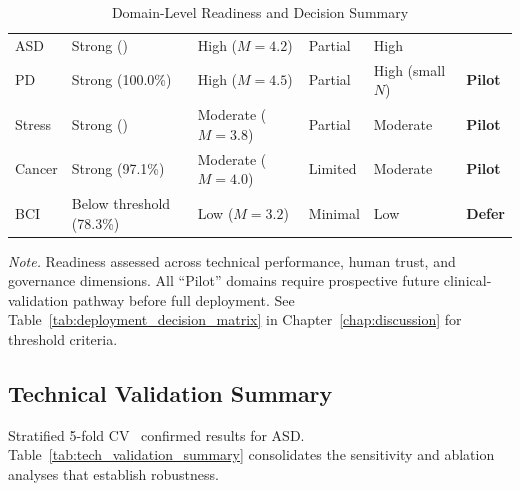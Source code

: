 {\tablestripes\tablefontsize
\begin{xltabular}{\textwidth}{@{} >{\raggedright\arraybackslash}p{1.0cm} L L L L l @{}}
\caption[Domain-Level Readiness and Decision Summary]{Domain-Level Readiness and Decision Summary}\label{tab:domain_readiness} \\
\toprule
{} &  &  &  &  &  \\
\midrule
\endfirsthead
\endhead
\bottomrule
\endlastfoot
ASD & Strong (\asdacc{}) & High ($M = 4.2$) & Partial & High &  \\
PD & Strong (100.0\%) & High ($M = 4.5$) & Partial & High (small $N$) & \textbf{Pilot} \\
Stress & Strong (\stressacc{}) & Moderate ($M = 3.8$) & Partial & Moderate & \textbf{Pilot} \\
Cancer & Strong (97.1\%) & Moderate ($M = 4.0$) & Limited & Moderate & \textbf{Pilot} \\
BCI & Below threshold (78.3\%) & Low ($M = 3.2$) & Minimal & Low & \textbf{Defer} \\
\end{xltabular}}
\vspace{2pt}
\noindent\textit{Note.} Readiness assessed across technical performance, human trust, and governance dimensions. All ``Pilot'' domains require prospective future clinical-validation pathway before full deployment. See Table~\ref{tab:deployment_decision_matrix} in Chapter~\ref{chap:discussion} for threshold criteria.
\fi %

\subsection{Technical Validation Summary}

Stratified 5-fold CV~\cite{kohavi1995crossvalidation} confirmed results for ASD. Table~\ref{tab:tech_validation_summary} consolidates the sensitivity and ablation analyses that establish robustness.


